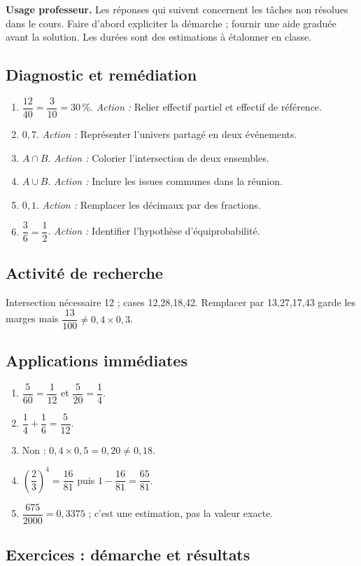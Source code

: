\label{C05-CORR}
\textbf{Usage professeur.} Les réponses qui suivent concernent les tâches non résolues dans le cours. Faire d’abord expliciter la démarche ; fournir une aide graduée avant la solution. Les durées sont des estimations à étalonner en classe.
\subsection*{Diagnostic et remédiation}
\begin{enumerate}
\item $\dfrac{12}{40}=\dfrac{3}{10}=30\,\%$. \textit{Action :} Relier effectif partiel et effectif de référence.
\item $0{,}7$. \textit{Action :} Représenter l’univers partagé en deux événements.
\item $A\cap B$. \textit{Action :} Colorier l’intersection de deux ensembles.
\item $A\cup B$. \textit{Action :} Inclure les issues communes dans la réunion.
\item $0{,}1$. \textit{Action :} Remplacer les décimaux par des fractions.
\item $\dfrac{3}{6}=\dfrac{1}{2}$. \textit{Action :} Identifier l’hypothèse d’équiprobabilité.
\end{enumerate}
\subsection*{Activité de recherche}
Intersection nécessaire 12 ; cases 12,28,18,42. Remplacer par 13,27,17,43 garde les marges mais $\dfrac{13}{100}\ne 0{,}4\times 0{,}3$.
\subsection*{Applications immédiates}
\begin{enumerate}
\item $\dfrac{5}{60}=\dfrac{1}{12}$ et $\dfrac{5}{20}=\dfrac{1}{4}$.
\item $\dfrac{1}{4}+\dfrac{1}{6}=\dfrac{5}{12}$.
\item Non : $0{,}4\times0{,}5=0{,}20\ne0{,}18$.
\item $(\dfrac{2}{3})^4=\dfrac{16}{81}$ puis $1-\dfrac{16}{81}=\dfrac{65}{81}$.
\item $\dfrac{675}{2000}=0{,}3375$ ; c’est une estimation, pas la valeur exacte.
\end{enumerate}
\subsection*{Exercices : démarche et résultats}
